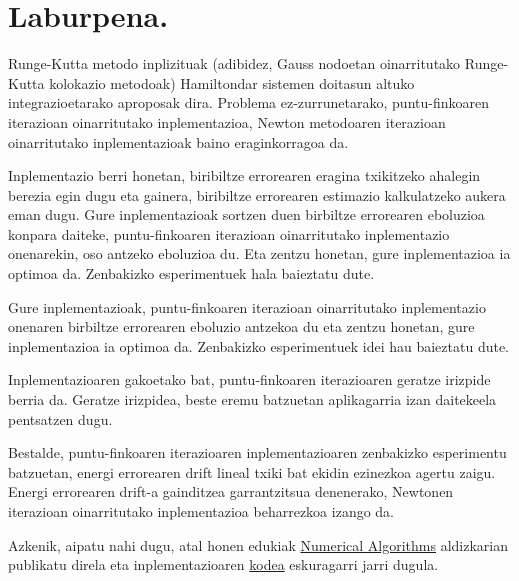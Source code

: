 \section{Laburpena.}

Runge-Kutta metodo inplizituak (adibidez, Gauss nodoetan oinarritutako Runge-Kutta kolokazio metodoak) Hamiltondar sistemen doitasun altuko integrazioetarako aproposak dira. Problema ez-zurrunetarako, puntu-finkoaren iterazioan oinarritutako inplementazioa, Newton metodoaren iterazioan oinarritutako inplementazioak baino eraginkorragoa da.

Inplementazio berri honetan, biribiltze errorearen eragina txikitzeko ahalegin berezia egin dugu eta  gainera, biribiltze errorearen estimazio kalkulatzeko aukera eman dugu. Gure inplementazioak sortzen duen birbiltze errorearen eboluzioa konpara daiteke, puntu-finkoaren iterazioan oinarritutako inplementazio onenarekin, oso antzeko eboluzioa du. Eta zentzu honetan, gure inplementazioa ia optimoa da. Zenbakizko esperimentuek hala baieztatu dute.

Gure inplementazioak, puntu-finkoaren iterazioan oinarritutako inplementazio onenaren birbiltze errorearen eboluzio antzekoa du eta zentzu honetan, gure inplementazioa ia optimoa da. Zenbakizko esperimentuek idei hau baieztatu dute.

Inplementazioaren gakoetako bat, puntu-finkoaren iterazioaren geratze irizpide berria da. Geratze irizpidea, beste eremu batzuetan aplikagarria izan daitekeela pentsatzen dugu.

Bestalde, puntu-finkoaren iterazioaren inplementazioaren zenbakizko esperimentu batzuetan,  energi errorearen drift lineal txiki bat ekidin ezinezkoa agertu zaigu. Energi errorearen drift-a gainditzea garrantzitsua denenerako, Newtonen iterazioan oinarritutako inplementazioa beharrezkoa izango da.

Azkenik, aipatu nahi dugu, atal honen edukiak \href{http://link.springer.com/journal/11075}{Numerical Algorithms} aldizkarian publikatu direla \cite{Antonana2017} eta inplementazioaren \href{https://github.com/mikelehu/IRK-FixedPoint}{kodea} eskuragarri jarri dugula. 
